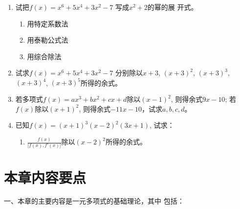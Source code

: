 \begin{enumerate}
\item 试把$f(x)=x^6+5x^4+3x^2-7$ 写成$x^2+2$的幂的展
开式。
\begin{multicols}{3}
    \begin{enumerate}
        \item 用特定系数法
        \item 用泰勒公式法
        \item 用综合除法
    \end{enumerate}
\end{multicols}
\item 试求$f(x)=x^6+5x^4+3x^2-7$ 分别除以$x+3$,
$(x+3)^2$, $(x+3)^3$, $(x+3)^4$, $(x+3)^5$所得的余式。

\item 若多项式$f(x)=ax^3+bx^2+cx+d$除以$(x-1)^2$, 则得余式$9x-10$; 若$f(x)$除以$(x+1)^2$, 则得余式$-11x-10$，试求$a,b,c,d$。

\item 已知$f(x)=(x+1)^3(x-2)^2(3x+1)$, 试求：
\begin{enumerate}
    \item $\frac{f(x)}{\big[f(x),f'(x)\big]}$除以$(x-2)^2$所得的余式。
\end{enumerate}
\end{enumerate}

\section*{本章内容要点}

一、本章的主要内容是一元多项式的基础理论，其中
包括：

